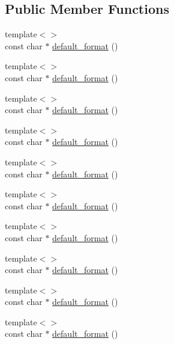 \subsection*{Public Member Functions}
\begin{DoxyCompactItemize}
\item 
{\footnotesize template$<$$>$ }\\const char $\ast$ \hyperlink{struct_d_d4hep_1_1_primitive_a6089a5537a1e451b9e9dab455068d31c}{default\_\-format} ()
\item 
{\footnotesize template$<$$>$ }\\const char $\ast$ \hyperlink{struct_d_d4hep_1_1_primitive_a34149cd93b872c60022fa76228c455ee}{default\_\-format} ()
\item 
{\footnotesize template$<$$>$ }\\const char $\ast$ \hyperlink{struct_d_d4hep_1_1_primitive_a67ee0ebbf2f9e48bf65beb1e59959cbf}{default\_\-format} ()
\item 
{\footnotesize template$<$$>$ }\\const char $\ast$ \hyperlink{struct_d_d4hep_1_1_primitive_a60d74c3b3478378f03ef5d6f86396649}{default\_\-format} ()
\item 
{\footnotesize template$<$$>$ }\\const char $\ast$ \hyperlink{struct_d_d4hep_1_1_primitive_a39e4c6eb8b74e74fed0764e9bb6fef0d}{default\_\-format} ()
\item 
{\footnotesize template$<$$>$ }\\const char $\ast$ \hyperlink{struct_d_d4hep_1_1_primitive_a8274c3e042d1ebcae041780ef4237f75}{default\_\-format} ()
\item 
{\footnotesize template$<$$>$ }\\const char $\ast$ \hyperlink{struct_d_d4hep_1_1_primitive_a737b938859099ac8ee5c644481f99120}{default\_\-format} ()
\item 
{\footnotesize template$<$$>$ }\\const char $\ast$ \hyperlink{struct_d_d4hep_1_1_primitive_a496cc6580fe5688d8e013291003745cf}{default\_\-format} ()
\item 
{\footnotesize template$<$$>$ }\\const char $\ast$ \hyperlink{struct_d_d4hep_1_1_primitive_a866210de66db8555ea809ff0d39eb957}{default\_\-format} ()
\item 
{\footnotesize template$<$$>$ }\\const char $\ast$ \hyperlink{struct_d_d4hep_1_1_primitive_a72abbbbcfae0f99bd5456794293b2696}{default\_\-format} ()

\end{DoxyCompactItemize}
